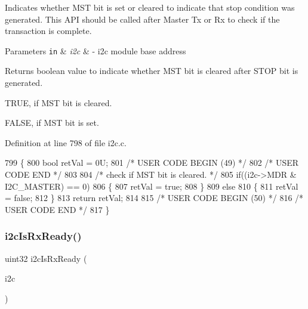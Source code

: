 Indicates whether M\+ST bit is set or cleared to indicate that stop condition was generated. This A\+PI should be called after Master Tx or Rx to check if the transaction is complete. 


\begin{DoxyParams}[1]{Parameters}
\mbox{\tt in}  & {\em i2c} & -\/ i2c module base address \\
\hline
\end{DoxyParams}
\begin{DoxyReturn}{Returns}
boolean value to indicate whether M\+ST bit is cleared after S\+T\+OP bit is generated.
\begin{DoxyItemize}
\item T\+R\+UE, if M\+ST bit is cleared.
\item F\+A\+L\+SE, if M\+ST bit is set. 
\end{DoxyItemize}
\end{DoxyReturn}


Definition at line 798 of file i2c.\+c.


\begin{DoxyCode}
799 \{
800     \textcolor{keywordtype}{bool} retVal = 0U;
801 \textcolor{comment}{/* USER CODE BEGIN (49) */}
802 \textcolor{comment}{/* USER CODE END */}
803 
804     \textcolor{comment}{/* check if MST bit is cleared. */}
805     \textcolor{keywordflow}{if}((i2c->MDR & I2C\_MASTER) == 0)
806     \{
807         retVal = \textcolor{keyword}{true};
808     \}
809     \textcolor{keywordflow}{else}
810     \{
811         retVal = \textcolor{keyword}{false};
812     \}
813     \textcolor{keywordflow}{return} retVal;
814 
815 \textcolor{comment}{/* USER CODE BEGIN (50) */}
816 \textcolor{comment}{/* USER CODE END */}
817 \}
\end{DoxyCode}
\mbox{\label{group__I2C_ga0ce73ebbc066986b3cbbd6c56fd14a9c}} 
\subsubsection{\texorpdfstring{i2c\+Is\+Rx\+Ready()}{i2cIsRxReady()}}
{\footnotesize\ttfamily uint32 i2c\+Is\+Rx\+Ready (\begin{DoxyParamCaption}\item[{\mbox{\hyperlink{reg__i2c_8h_a5d6c119fb20e803a530d0d4df544daf7}{i2c\+B\+A\+S\+E\+\_\+t}} $\ast$}]{i2c }\end{DoxyParamCaption})}



